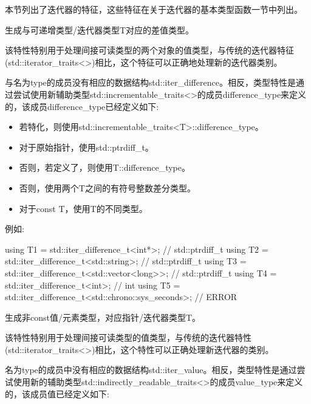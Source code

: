 

本节列出了迭代器的特征，这些特征在关于迭代器的基本类型函数一节中列出。



生成与可递增类型/迭代器类型T对应的差值类型。

该特性特别用于处理间接可读类型的两个对象的值类型，与传统的迭代器特征(std::iterator\_traits<>)相比，这个特征可以正确地处理新的迭代器类别。

与名为type的成员没有相应的数据结构std::iter\_difference。相反，类型特性是通过尝试使用新辅助类型std::incrementable\_traits<>的成员difference\_type来定义的，该成员difference\_type已经定义如下:

\begin{itemize}
\item
若特化，则使用std::incrementable\_traits<T>::difference\_type。

\item
对于原始指针，使用std::ptrdiff\_t。

\item
否则，若定义了，则使用T::difference\_type。

\item
否则，使用两个T之间的有符号整数差分类型。

\item
对于const T，使用T的不同类型。
\end{itemize}

例如:

\begin{cpp}
using T1 = std::iter_difference_t<int*>; // std::ptrdiff_t
using T2 = std::iter_difference_t<std::string>; // std::ptrdiff_t
using T3 = std::iter_difference_t<std::vector<long>>; // std::ptrdiff_t
using T4 = std::iter_difference_t<int>; // int
using T5 = std::iter_difference_t<std::chrono::sys_seconds>; // ERROR
\end{cpp}



生成非const值/元素类型，对应指针/迭代器类型T。

该特性特别用于处理间接可读类型的值类型，与传统的迭代器特性(std::iterator\_traits<>)相比，这个特性可以正确处理新迭代器的类别。

名为type的成员中没有相应的数据结构std::iter\_value。相反，类型特性是通过尝试使用新的辅助类型std::indirectly\_readable\_traits<>的成员value\_type来定义的，该成员值已经定义如下:

